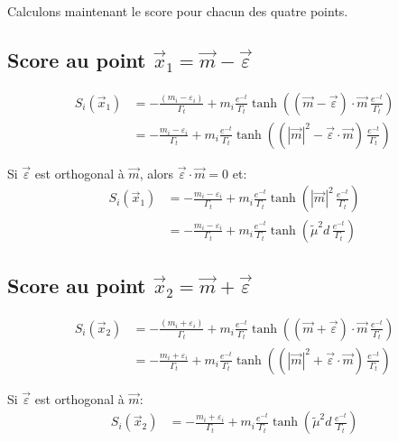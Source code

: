 \documentclass[11pt,a4paper]{article}
\begin{document}
Calculons maintenant le score pour chacun des quatre points.

\subsection{Score au point $\vec{x}_1 = \vec{m} - \vec{\varepsilon}$}

\begin{align}
S_i(\vec{x}_1) &= -\frac{(m_i - \varepsilon_i)}{\Gamma_t}+m_i \frac{e^{-t}}{\Gamma_t}\tanh\left( (\vec{m} - \vec{\varepsilon}) \cdot \vec{m} \, \frac{e^{-t}}{\Gamma_t}\right) \\
&= -\frac{m_i - \varepsilon_i}{\Gamma_t}+m_i \frac{e^{-t}}{\Gamma_t}\tanh\left( (|\vec{m}|^2 - \vec{\varepsilon} \cdot \vec{m}) \, \frac{e^{-t}}{\Gamma_t}\right)
\end{align}

Si $\vec{\varepsilon}$ est orthogonal à $\vec{m}$, alors $\vec{\varepsilon} \cdot \vec{m} = 0$ et:
\begin{align}
S_i(\vec{x}_1) &= -\frac{m_i - \varepsilon_i}{\Gamma_t}+m_i \frac{e^{-t}}{\Gamma_t}\tanh\left( |\vec{m}|^2 \, \frac{e^{-t}}{\Gamma_t}\right) \\
&= -\frac{m_i - \varepsilon_i}{\Gamma_t}+m_i \frac{e^{-t}}{\Gamma_t}\tanh\left( \tilde{\mu}^2 d \, \frac{e^{-t}}{\Gamma_t}\right)
\end{align}

\subsection{Score au point $\vec{x}_2 = \vec{m} + \vec{\varepsilon}$}

\begin{align}
S_i(\vec{x}_2) &= -\frac{(m_i + \varepsilon_i)}{\Gamma_t}+m_i \frac{e^{-t}}{\Gamma_t}\tanh\left( (\vec{m} + \vec{\varepsilon}) \cdot \vec{m} \, \frac{e^{-t}}{\Gamma_t}\right) \\
&= -\frac{m_i + \varepsilon_i}{\Gamma_t}+m_i \frac{e^{-t}}{\Gamma_t}\tanh\left( (|\vec{m}|^2 + \vec{\varepsilon} \cdot \vec{m}) \, \frac{e^{-t}}{\Gamma_t}\right)
\end{align}

Si $\vec{\varepsilon}$ est orthogonal à $\vec{m}$:
\begin{align}
S_i(\vec{x}_2) &= -\frac{m_i + \varepsilon_i}{\Gamma_t}+m_i \frac{e^{-t}}{\Gamma_t}\tanh\left( \tilde{\mu}^2 d \, \frac{e^{-t}}{\Gamma_t}\right)
\end{align}
\end{document}
